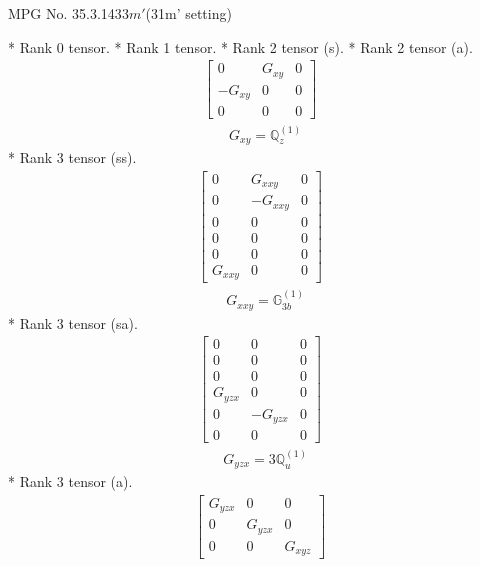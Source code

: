 \documentclass[fleqn,8pt,landscape]{jsarticle}
\begin{document}
\setcounter{MaxMatrixCols}{32}

\renewcommand{\tablename}{Table~}
\renewcommand{\figurename}{Figure~}
\begin{center}
\LARGE
MPG No. 35.3.143\quad$3m'$\quad(31m' setting)
\end{center}
* Rank 0 tensor.
* Rank 1 tensor.
* Rank 2 tensor (s).
* Rank 2 tensor (a).
\begin{align*}
\begin{bmatrix} 0 & G_{xy} & 0 \\ - G_{xy} & 0 & 0 \\ 0 & 0 & 0 \end{bmatrix}
\end{align*}
\begin{align*}
& G_{xy} = \mathbb{Q}_{z}^{(1)}
\end{align*}
* Rank 3 tensor (ss).
\begin{align*}
\begin{bmatrix} 0 & G_{xxy} & 0 \\ 0 & - G_{xxy} & 0 \\ 0 & 0 & 0 \\ 0 & 0 & 0 \\ 0 & 0 & 0 \\ G_{xxy} & 0 & 0 \end{bmatrix}
\end{align*}
\begin{align*}
& G_{xxy} = \mathbb{G}_{3b}^{(1)}
\end{align*}
* Rank 3 tensor (sa).
\begin{align*}
\begin{bmatrix} 0 & 0 & 0 \\ 0 & 0 & 0 \\ 0 & 0 & 0 \\ G_{yzx} & 0 & 0 \\ 0 & - G_{yzx} & 0 \\ 0 & 0 & 0 \end{bmatrix}
\end{align*}
\begin{align*}
& G_{yzx} = 3 \mathbb{Q}_{u}^{(1)}
\end{align*}
* Rank 3 tensor (a).
\begin{align*}
\begin{bmatrix} G_{yzx} & 0 & 0 \\ 0 & G_{yzx} & 0 \\ 0 & 0 & G_{xyz} \end{bmatrix}
\end{align*}
\end{document}
